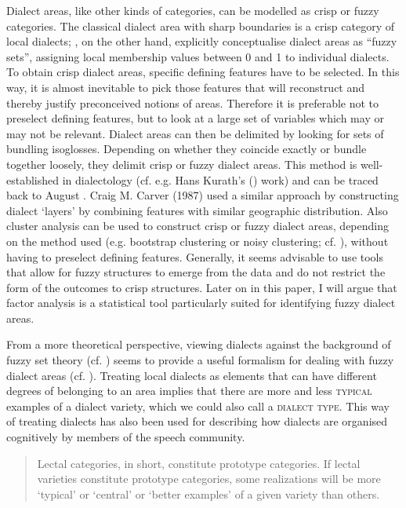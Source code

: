 \documentclass[output=paper]{LSP/langsci}
\begin{document}
Dialect areas, like other kinds of categories, can be modelled as crisp or fuzzy categories. The classical dialect area with sharp boundaries is a crisp category of local dialects; \citet[108--113]{preston_applications_1993}, on the other hand, explicitly conceptualise dialect areas as “fuzzy sets”, assigning local membership values between 0 and 1 to individual dialects. To obtain crisp dialect areas, specific defining features have to be selected. In this way, it is almost inevitable to pick those features that will reconstruct and thereby justify preconceived notions of areas. Therefore it is preferable not to preselect defining features, but to look at a large set of variables which may or may not be relevant. Dialect areas can then be delimited by looking for sets of bundling isoglosses. Depending on whether they coincide exactly or bundle together loosely, they delimit crisp or fuzzy dialect areas. This method is well-established in dialectology (cf. e.g. Hans Kurath’s (\citeyear{kurath_studies_1972}) work) and can be traced back to August \citet{bielenstein_grenzen_1892}. Craig M. Carver (1987) %
used a similar approach by constructing dialect ‘layers’ by combining features with similar geographic distribution. Also cluster analysis can be used to construct crisp or fuzzy dialect areas, depending on the method used (e.g. bootstrap clustering or noisy clustering; cf. \citealt[83]{nerbonne_gabmap_2011}), without having to preselect defining features. Generally, it seems advisable to use tools that allow for fuzzy structures to emerge from the data and do not restrict the form of the outcomes to crisp structures. Later on in this paper, I will argue that factor analysis is a statistical tool particularly suited for identifying fuzzy dialect areas.

From a more theoretical perspective, viewing dialects against the background of fuzzy set theory (cf. \citealt{zadeh_fuzzy_1965}) seems to provide a useful formalism for dealing with fuzzy dialect areas (cf. \citealt{preston_applications_1993}). Treating local dialects as elements that can have different degrees of belonging to an area implies that there are more and less \textsc{typical} examples of a dialect variety, which we could also call a \textsc{dialect type}. This way of treating dialects has also been used for describing how dialects are organised cognitively by members of the speech community.

\begin{quote}
Lectal categories, in short, constitute prototype categories. If lectal varieties constitute prototype categories, some realizations will be more ‘typical’ or ‘central’ or ‘better examples’ of a given variety than others. \citep[59]{kristiansen_style-shifting_2008}
\end{quote}
\end{document}
